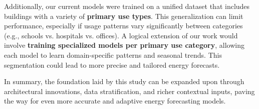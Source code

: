Additionally, our current models were trained on a unified dataset that includes buildings with a variety of \textbf{primary use types}. This generalization can limit performance, especially if usage patterns vary significantly between categories (e.g., schools vs. hospitals vs. offices). A logical extension of our work would involve \textbf{training specialized models per primary use category}, allowing each model to learn domain-specific patterns and seasonal trends. This segmentation could lead to more precise and tailored energy forecasts.

In summary, the foundation laid by this study can be expanded upon through architectural innovations, data stratification, and richer contextual inputs, paving the way for even more accurate and adaptive energy forecasting models.
